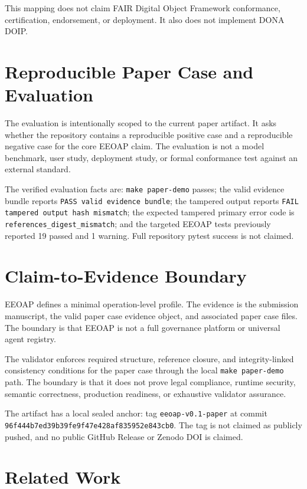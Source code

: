 \documentclass[11pt]{article}
\begin{document}
This mapping does not claim FAIR Digital Object Framework conformance,
certification, endorsement, or deployment. It also does not implement DONA
DOIP.

\section{Reproducible Paper Case and Evaluation}

The evaluation is intentionally scoped to the current paper artifact. It asks
whether the repository contains a reproducible positive case and a
reproducible negative case for the core EEOAP claim. The evaluation is not a
model benchmark, user study, deployment study, or formal conformance test
against an external standard.

The verified evaluation facts are: \texttt{make paper-demo} passes; the valid
evidence bundle reports \texttt{PASS valid evidence bundle}; the tampered
output reports \texttt{FAIL tampered output hash mismatch}; the expected
tampered primary error code is \texttt{references\_digest\_mismatch}; and the
targeted EEOAP tests previously reported 19 passed and 1 warning. Full
repository pytest success is not claimed.

\section{Claim-to-Evidence Boundary}

EEOAP defines a minimal operation-level profile. The evidence is the
submission manuscript, the valid paper case evidence object, and associated
paper case files. The boundary is that EEOAP is not a full governance platform
or universal agent registry.

The validator enforces required structure, reference closure, and
integrity-linked consistency conditions for the paper case through the local
\texttt{make paper-demo} path. The boundary is that it does not prove legal
compliance, runtime security, semantic correctness, production readiness, or
exhaustive validator assurance.

The artifact has a local sealed anchor: tag \texttt{eeoap-v0.1-paper} at
commit \texttt{96f444b7ed39b39fe9f47e428af835952e843cb0}. The tag is not
claimed as publicly pushed, and no public GitHub Release or Zenodo DOI is
claimed.

\section{Related Work}
\end{document}
